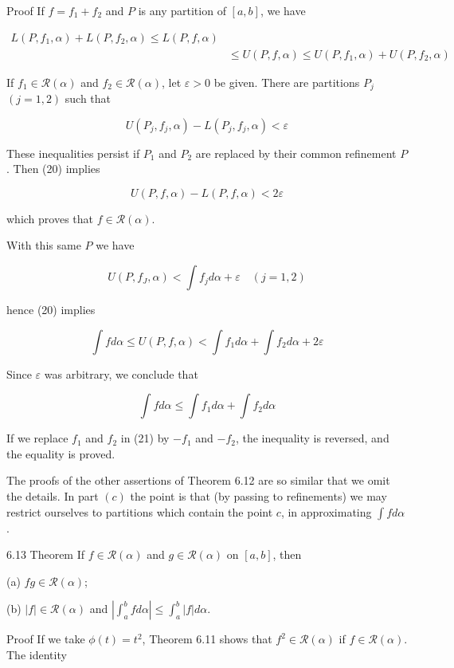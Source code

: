 \documentclass[10pt]{article}
\begin{document}
Proof If $f=f_{1}+f_{2}$ and $P$ is any partition of $[a, b]$, we have

$$
\begin{aligned}
L\left(P, f_{1}, \alpha\right)+L\left(P, f_{2}, \alpha\right) \leq L(P, f, \alpha) & \\
& \leq U(P, f, \alpha) \leq U\left(P, f_{1}, \alpha\right)+U\left(P, f_{2}, \alpha\right)
\end{aligned}
$$

If $f_{1} \in \mathscr{R}(\alpha)$ and $f_{2} \in \mathscr{R}(\alpha)$, let $\varepsilon>0$ be given. There are partitions $P_{j}$ $(j=1,2)$ such that

$$
U\left(P_{j}, f_{j}, \alpha\right)-L\left(P_{j}, f_{j}, \alpha\right)<\varepsilon
$$

These inequalities persist if $P_{1}$ and $P_{2}$ are replaced by their common refinement $P$. Then (20) implies

$$
U(P, f, \alpha)-L(P, f, \alpha)<2 \varepsilon
$$

which proves that $f \in \mathscr{R}(\alpha)$.

With this same $P$ we have

$$
U\left(P, f_{J}, \alpha\right)<\int f_{j} d \alpha+\varepsilon \quad(j=1,2)
$$

hence (20) implies

$$
\int f d \alpha \leq U(P, f, \alpha)<\int f_{1} d \alpha+\int f_{2} d \alpha+2 \varepsilon
$$

Since $\varepsilon$ was arbitrary, we conclude that

$$
\int f d \alpha \leq \int f_{1} d \alpha+\int f_{2} d \alpha
$$

If we replace $f_{1}$ and $f_{2}$ in (21) by $-f_{1}$ and $-f_{2}$, the inequality is reversed, and the equality is proved.

The proofs of the other assertions of Theorem 6.12 are so similar that we omit the details. In part $(c)$ the point is that (by passing to refinements) we may restrict ourselves to partitions which contain the point $c$, in approximating $\int f d \alpha$.

6.13 Theorem If $f \in \mathscr{R}(\alpha)$ and $g \in \mathscr{R}(\alpha)$ on $[a, b]$, then

(a) $f g \in \mathscr{R}(\alpha)$;

(b) $|f| \in \mathscr{R}(\alpha)$ and $\left|\int_{a}^{b} f d \alpha\right| \leq \int_{a}^{b}|f| d \alpha$.

Proof If we take $\phi(t)=t^{2}$, Theorem 6.11 shows that $f^{2} \in \mathscr{R}(\alpha)$ if $f \in \mathscr{R}(\alpha)$. The identity
\end{document}

